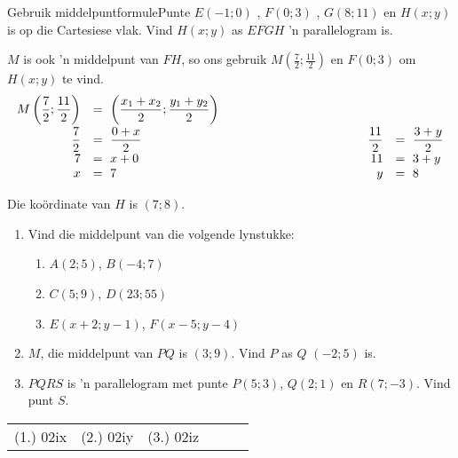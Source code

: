 \begin{wex}{Gebruik middelpuntformule}{Punte $E(-1;0)$ , $F(0;3)$ , $G(8;11)$ en $H(x;y)$ is op die Cartesiese vlak. Vind $H(x;y)$ as $EFGH$ 'n parallelogram is.}
{
$M$ is ook 'n middelpunt van $FH$, so ons gebruik $M(\frac{7}{2};\frac{11}{2})$ en $F(0;3)$ om $H(x;y)$ te vind.
\begin{equation*}
\begin{array}{rllrl}
 M\left(\dfrac{7}{2};\dfrac{11}{2}\right) &=~\left(\dfrac{x_1+x_2}{2}; \dfrac{y_1+y_2}{2}\right)\\[8pt]
\dfrac{7}{2}&=~\dfrac{0+x}{2}&\hskip10em&\dfrac{11}{2}&=~\dfrac{3+y}{2}\\
7&=~x+0&&11&=~3+y\\
x&=~7&&y&=~8\\
\end{array}
\end{equation*}

Die ko\"ordinate van $H$ is $(7;8)$.
}
\end{wex}
\begin{exercises}{}
\begin{enumerate}[itemsep=5pt, label=\textbf{\arabic*}. ]
\item Vind die middelpunt van die volgende lynstukke:
  \begin{enumerate}[noitemsep, label=\textbf{(\alph*)} ]
\item $A(2;5)$, $B(-4;7)$
\item $C(5;9)$, $D(23;55)$
\item $E(x+2;y-1)$, $F(x-5;y-4)$
\end{enumerate}

\item $M$, die middelpunt van $PQ$ is $(3;9)$. Vind $P$ as $Q$  $(-2;5)$ is.
\item $PQRS$ is 'n parallelogram met punte $P(5;3)$, $Q(2;1)$ en $R(7;-3)$. Vind punt $S$.

\end{enumerate}
\par \practiceinfo
\par \begin{tabular}[h]{cccccc}
(1.)	02ix	&
(2.)	02iy	&
(3.)	02iz	&
\end{tabular}
\end{exercises}    
